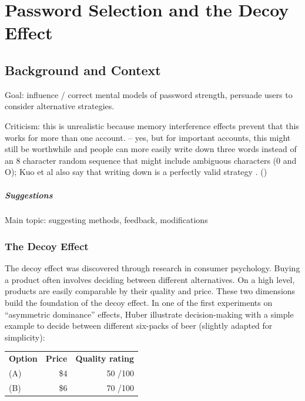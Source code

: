 \chapter[Password Selection and the Decoy Effect]{Password Selection and the Decoy Effect}\label{chap:decoy}




\section{Background and Context}

Goal: influence / correct mental models of password strength, persuade users to consider alternative strategies. 

Criticism: this is unrealistic because memory interference effects prevent that this works for more than one account. -- yes, but for important accounts, this might still be worthwhile and people can more easily write down three words instead of an 8 character random sequence that might include ambiguous characters (0 and O); Kuo et al also say that writing down is a perfectly valid strategy \cite{Kuo2006HumanSelectionMnemonic}. ()

\paragraph{Suggestions}
Main topic: suggesting methods, feedback, modifications

\subsection{The Decoy Effect}
The decoy effect was discovered through research in consumer psychology. Buying a product often involves deciding between different alternatives. On a high level, products are easily comparable by their quality and price. These two dimensions build the foundation of the decoy effect. In one of the first experiments on ``asymmetric dominance'' effects, Huber \etal illustrate decision-making with a simple example to decide between different six-packs of beer\cite{Huber1982AsymetricallyDominated} (slightly adapted for simplicity): 
\begin{table}[!h]
\begin{tabular}{lrr}
	\textbf{Option} & \textbf{Price} & \textbf{Quality rating}\\
	(A) & \$4 & 50 /100\\
	(B) & \$6 & 70 /100\\
\end{tabular}
\end{table}

